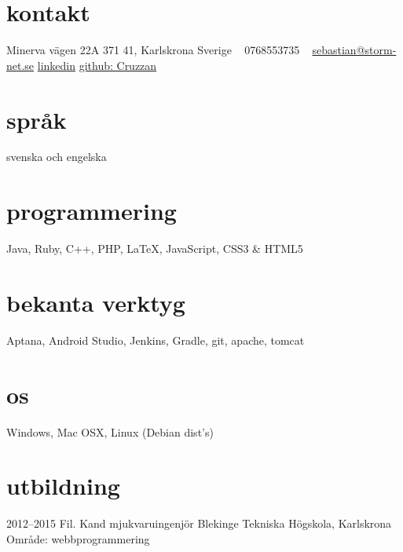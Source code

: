 \documentclass[]{friggeri-cv} %
\begin{document}


\begin{aside} %
\section{kontakt}
Minerva vägen 22A
371 41, Karlskrona
Sverige
~
0768553735
~
\href{mailto:sebastian@storm-net.se}{sebastian@storm-net.se}
\href{https://se.linkedin.com/pub/sebastian-hultstrand/60/51a/151}{linkedin}
\href{https://github.com/cruzzan}{github: Cruzzan}
\section{språk}
svenska och engelska
\section{programmering}
Java, Ruby, C++, PHP, LaTeX, JavaScript, CSS3 \& HTML5
\section{bekanta verktyg}
Aptana, Android Studio, Jenkins, Gradle, git, apache, tomcat
\section{os}
Windows, Mac OSX, Linux (Debian dist's)
\end{aside}


\section{utbildning}

\begin{entrylist}
\entry
{2012--2015}
{Fil. Kand {\normalfont mjukvaruingenjör}}
{Blekinge Tekniska Högskola, Karlskrona}
{Område: webbprogrammering}
\end{entrylist}
\end{document}
